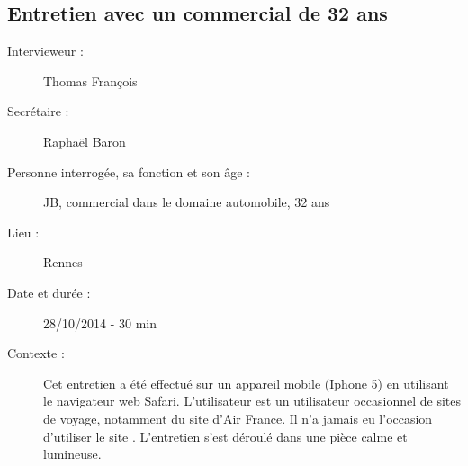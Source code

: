 \subsection{Entretien avec un commercial de 32 ans}

\begin{description}
\item [Intervieweur :] Thomas Fran\c{c}ois
\item [Secr\'{e}taire :] Rapha\"{e}l Baron
\item [Personne interrog\'{e}e, sa fonction et son \^{a}ge :] JB, commercial dans le domaine automobile, 32 ans
\item [Lieu :] Rennes
\item [Date et dur\'{e}e :] 28/10/2014 - 30 min
\item [Contexte :] Cet entretien a \'{e}t\'{e} effectu\'{e} sur un appareil mobile (Iphone 5) en utilisant le navigateur web Safari. L'utilisateur est un utilisateur occasionnel de sites de voyage, notamment du site d'Air France. Il n'a jamais eu l'occasion d'utiliser le site \kel. L'entretien s'est d\'{e}roul\'{e} dans une pi\`{e}ce calme et lumineuse. 
\end{description}


